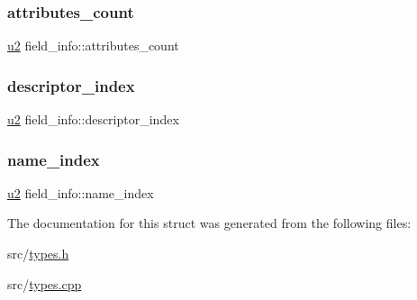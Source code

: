 \mbox{\label{structfield__info_a83bfa4ff84a608e3dbd1c3968ebe1b80}} 
\subsubsection{\texorpdfstring{attributes\+\_\+count}{attributes\_count}}
{\footnotesize\ttfamily \hyperlink{types_8h_ae676e9207f57fb921dca7366b2f59c53}{u2} field\+\_\+info\+::attributes\+\_\+count}

\mbox{\label{structfield__info_a12dd492b7fb1d61da1ac14938d97b07f}} 
\subsubsection{\texorpdfstring{descriptor\+\_\+index}{descriptor\_index}}
{\footnotesize\ttfamily \hyperlink{types_8h_ae676e9207f57fb921dca7366b2f59c53}{u2} field\+\_\+info\+::descriptor\+\_\+index}

\mbox{\label{structfield__info_a425e3ae85badd81c67ef00acca85ad9e}} 
\subsubsection{\texorpdfstring{name\+\_\+index}{name\_index}}
{\footnotesize\ttfamily \hyperlink{types_8h_ae676e9207f57fb921dca7366b2f59c53}{u2} field\+\_\+info\+::name\+\_\+index}



The documentation for this struct was generated from the following files\+:\begin{DoxyCompactItemize}
\item 
src/\hyperlink{types_8h}{types.\+h}\item 
src/\hyperlink{types_8cpp}{types.\+cpp}\end{DoxyCompactItemize}
